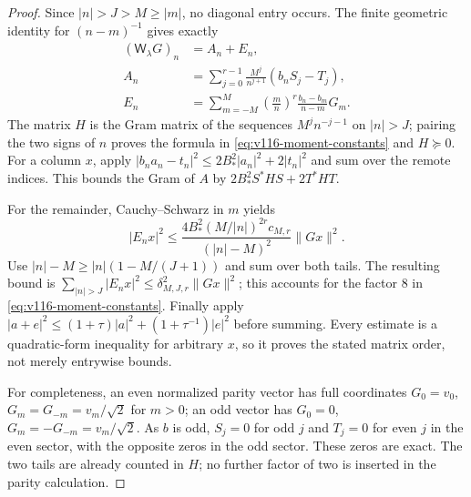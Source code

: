 \documentclass[11pt]{article}
\theoremstyle{remark}
\begin{document}
\begin{proof}
Since $|n|>J>M\ge|m|$, no diagonal entry occurs.  The finite geometric
identity for $(n-m)^{-1}$ gives exactly
\begin{align*}
 (\mathsf W_\lambda G)_n&=A_n+E_n,\\
 A_n&=\sum_{j=0}^{r-1}\frac{M^j}{n^{j+1}}(b_nS_j-T_j),\\
 E_n&=\sum_{m=-M}^M\left(\frac mn\right)^r
                         \frac{b_n-b_m}{n-m}G_m.
\end{align*}
The matrix $H$ is the Gram matrix of the sequences
$M^j n^{-j-1}$ on $|n|>J$; pairing the two signs of $n$ proves the
formula in \eqref{eq:v116-moment-constants} and $H\succeq0$.
For a column $x$, apply
$|b_na_n-t_n|^2\le2B_*^2|a_n|^2+2|t_n|^2$ and sum over the remote
indices.  This bounds the Gram of $A$ by
$2B_*^2S^*HS+2T^*HT$.

For the remainder, Cauchy--Schwarz in $m$ yields
\[
 |E_nx|^2\le
 \frac{4B_*^2(M/|n|)^{2r}c_{M,r}}{(|n|-M)^2}\|Gx\|^2.
\]
Use $|n|-M\ge|n|(1-M/(J+1))$ and sum over both tails.
The resulting bound is
$\sum_{|n|>J}|E_nx|^2\le\delta_{M,J,r}^{2}\|Gx\|^2$;
this accounts for the factor $8$ in
\eqref{eq:v116-moment-constants}.  Finally apply
$|a+e|^2\le(1+\tau)|a|^2+(1+\tau^{-1})|e|^2$ before summing.
Every estimate is a quadratic-form inequality for arbitrary $x$, so
it proves the stated matrix order, not merely entrywise bounds.

For completeness, an even normalized parity vector has full
coordinates $G_0=v_0$, $G_m=G_{-m}=v_m/\sqrt2$ for $m>0$;
an odd vector has $G_0=0$, $G_m=-G_{-m}=v_m/\sqrt2$.
As $b$ is odd, $S_j=0$ for odd $j$ and $T_j=0$ for even $j$ in the
even sector, with the opposite zeros in the odd sector.
These zeros are exact.  The two tails are already counted in $H$;
no further factor of two is inserted in the parity calculation.
\end{proof}
\end{document}
